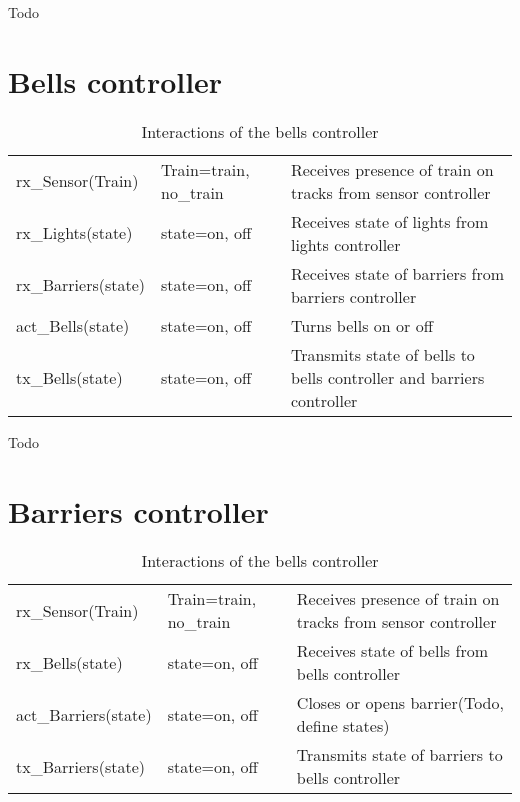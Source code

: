 \documentclass[final]{report}
\begin{document}
Todo

\section{Bells controller}
\begin{table}[h]
\centering
\begin{tabular}{|l|l|l|}
\hline
rx\_Sensor(Train)   & Train=train, no\_train & Receives presence of train on tracks from sensor controller           \\
rx\_Lights(state)   & state=on, off          & Receives state of lights from lights controller                      \\
rx\_Barriers(state) & state=on, off          & Receives state of barriers from barriers controller                  \\ \hline
act\_Bells(state)   & state=on, off          & Turns bells on or off                                                \\
tx\_Bells(state)    & state=on, off          & Transmits state of bells to bells controller and barriers controller\\ \hline
\end{tabular}
\caption{Interactions of the bells controller}
\label{bellsSignals}
\end{table}

Todo

\section{Barriers controller}
\begin{table}[h]
\centering
\begin{tabular}{|l|l|l|}
\hline
rx\_Sensor(Train)    & Train=train, no\_train & Receives presence of train on tracks from sensor controller \\
rx\_Bells(state)     & state=on, off          & Receives state of bells from bells controller               \\ \hline
act\_Barriers(state) & state=on, off          & Closes or opens barrier(Todo, define states)                \\
tx\_Barriers(state)  & state=on, off          & Transmits state of barriers to bells controller             \\ \hline
\end{tabular}
\caption{Interactions of the bells controller}
\label{barriersSignals}
\end{table}
\end{document}
